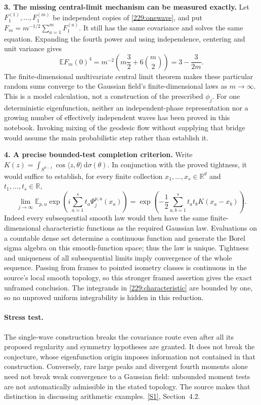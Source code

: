 \documentclass[11pt,a4paper]{article}
\newcommand{\R}{\mathbb{R}}
\newcommand{\E}{\mathbb{E}}
\newcommand{\dd}{\,\mathrm d}
\newcommand{\sref}[2]{\hyperlink{source:#1:#2}{[S#2]}}
\numberwithin{equation}{section}
\begin{document}
\textbf{3. The missing central-limit mechanism can be measured exactly.}
Let $F_1^{(1)},\ldots,F_1^{(m)}$ be independent copies of
\eqref{229:onewave}, and put $F_m=m^{-1/2}\sum_{a=1}^mF_1^{(a)}$.
It still has the same covariance and solves the same equation. Expanding
the fourth power and using independence, centering and unit variance gives
\[
 \E F_m(0)^4
 =m^{-2}\left(m\frac32+6\binom m2\right)
 =3-\frac{3}{2m}.
\]
The finite-dimensional multivariate central limit theorem makes these
particular random sums converge to the Gaussian field's finite-dimensional
laws as $m\to\infty$. This is a model calculation, not a construction of
the prescribed $\phi_j$. For one deterministic eigenfunction, neither an
independent-phase representation nor a growing number of effectively
independent waves has been proved in this notebook. Invoking mixing of
the geodesic flow without supplying that bridge would assume the main
probabilistic step rather than establish it.

\textbf{4. A precise bounded-test completion criterion.}
Write $K(z)=\int_{S^{d-1}}\cos\langle z,\theta\rangle\dd\sigma(\theta)$.
In conjunction with the proved tightness, it would suffice to establish,
for every finite collection $x_1,\ldots,x_s\in\R^d$ and
$t_1,\ldots,t_s\in\R$,
\begin{equation}\label{229:characteristic}
 \lim_{j\to\infty}\E_{p,u}
    \exp\left(i\sum_{a=1}^s t_a\Psi_j^{p,u}(x_a)\right)
 =\exp\left(-\frac12\sum_{a,b=1}^s t_at_bK(x_a-x_b)\right).
\end{equation}
Indeed every subsequential smooth law would then have the same
finite-dimensional characteristic functions as the required Gaussian law.
Evaluations on a countable dense set determine a continuous function and
generate the Borel sigma algebra on this smooth-function space; thus the
law is unique. Tightness and uniqueness of all subsequential limits imply
convergence of the whole sequence. Passing from frames to pointed
isometry classes is continuous in the source's local smooth topology,
so this stronger framed assertion gives the exact unframed conclusion.
The integrands in \eqref{229:characteristic} are bounded by one, so no
unproved uniform integrability is hidden in this reduction.

\paragraph{Stress test.}
The single-wave construction breaks the covariance route even after all
its proposed regularity and symmetry hypotheses are granted. It does not
break the conjecture, whose eigenfunction origin imposes information not
contained in that construction. Conversely, rare large peaks and divergent
fourth moments alone need not break weak convergence to a Gaussian field:
unbounded moment tests are not automatically admissible in the stated
topology. The source makes that distinction in discussing arithmetic
examples. \sref{229}{1}, Section~4.2.
\end{document}
